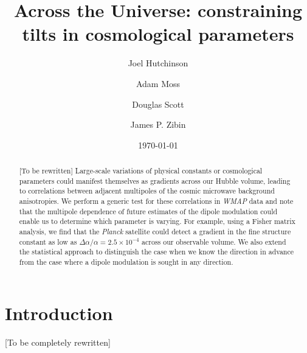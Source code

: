 \documentclass[twocolumn,aps,prd,showpacs]{revtex4}
\newcommand{\note}[1]{{\color{red}[#1]}}
\begin{document}
\title{Across the Universe: constraining tilts in cosmological
parameters}
\author{Joel Hutchinson} 

\author{Adam Moss} 

\author{Douglas Scott} 

\author{James P. Zibin} 

\date{\today}



\begin{abstract}
\note{To be rewritten}  Large-scale variations of
physical constants or cosmological parameters could manifest 
themselves as gradients across our Hubble volume, leading to correlations
between adjacent multipoles of the cosmic microwave background anisotropies.  
We perform a generic test for these correlations in {\it WMAP\/} data and note
that the multipole dependence of future estimates of the dipole
modulation could enable us to determine which parameter is varying.
For example, using a Fisher matrix analysis, we find that the
{\em Planck\/} satellite could detect a gradient
in the fine structure constant as low as
$\Delta\alpha/\alpha=2.5\times10^{-4}$ across our observable volume.
We also extend the statistical approach to distinguish the case when we
know the direction in advance from the case where a dipole modulation is
sought in any direction.
\end{abstract}

\maketitle





\section{Introduction}
\note{To be completely rewritten}  
\end{document}
